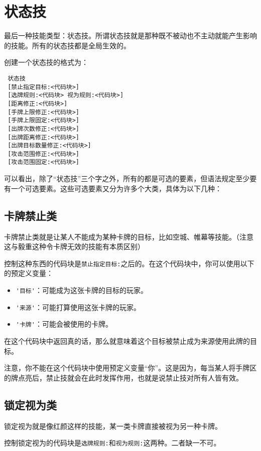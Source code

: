 \chapter{状态技}

最后一种技能类型：状态技。所谓状态技就是那种既不被动也不主动就能产生影响的技能。所有的状态技都是全局生效的。

创建一个状态技的格式为：

\begin{verbatim}
 状态技
 [禁止指定目标:<代码块>]
 [选牌规则:<代码块> 视为规则:<代码块>]
 [距离修正:<代码块>]
 [手牌上限修正:<代码块>]
 [手牌上限固定:<代码块>]
 [出牌次数修正:<代码块>]
 [出牌距离修正:<代码块>]
 [出牌目标数量修正:<代码块>]
 [攻击范围修正:<代码块>]
 [攻击范围固定:<代码块>]
\end{verbatim}

可以看出，除了“状态技”三个字之外，所有的都是可选的要素，但语法规定至少要有一个可选要素。这些可选要素又分为许多个大类，具体为以下几种：

\section{卡牌禁止类}

卡牌禁止类就是让某人不能成为某种卡牌的目标，比如空城、帷幕等技能。（注意这与毅重这种令卡牌无效的技能有本质区别）

控制这种东西的代码块是\verb|禁止指定目标:|之后的。在这个代码块中，你可以使用以下的预定义变量：

\begin{itemize}
 \item \verb|'目标'|：可能成为这张卡牌的目标的玩家。
 \item \verb|'来源'|：可能打算使用这张卡牌的玩家。
 \item \verb|'卡牌'|：可能会被使用的卡牌。
\end{itemize}

在这个代码块中返回真的话，那么就意味着这个目标被禁止成为来源使用此牌的目标。

注意，你不能在这个代码块中使用预定义变量“你”。这是因为，每当某人将手牌区的牌点亮后，禁止技就会在此时发挥作用，也就是说禁止技对所有人皆有效。

\section{锁定视为类}

锁定视为就是像红颜这样的技能，某一类卡牌直接被视为另一种卡牌。

控制锁定视为的代码块是\verb|选牌规则:|和\verb|视为规则:|这两种。二者缺一不可。

